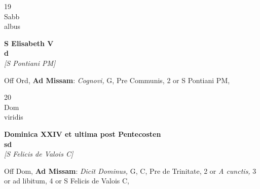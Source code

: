 \documentclass[10pt, openany]{book}
\begin{document}
        \begin{center}
            \begin{minipage}{3.5in}
                \vspace{2em}
                \begin{minipage}{0.5in}
                    {\Huge 19} \\
                    {\normalsize Sabb} \\
                    {\normalsize albus}
                \end{minipage}
                \begin{minipage}{3.0in}
                    \textbf{ \large S Elisabeth V \\
                    \textnormal{\normalsize d}} \\ \textit{[S Pontiani PM]} \\ 
                \end{minipage}
                \begin{justify}Off Ord, \textbf{Ad Missam}: \textit{Cognovi,} G, Pre Communis, 2 or S Pontiani PM,   
                \end{justify}
            \end{minipage}
        \end{center}
    
        \begin{center}
            \begin{minipage}{3.5in}
                \vspace{2em}
                \begin{minipage}{0.5in}
                    {\Huge 20} \\
                    {\normalsize Dom} \\
                    {\normalsize viridis}
                \end{minipage}
                \begin{minipage}{3.0in}
                    \textbf{ \large Dominica XXIV et ultima post Pentecosten \\
                    \textnormal{\normalsize sd}} \\ \textit{[S Felicis de Valois C]} \\ 
                \end{minipage}
                \begin{justify}Off Dom, \textbf{Ad Missam}: \textit{Dicit Dominus,} G, C, Pre de Trinitate, 2 or \textit{A cunctis,} 3 or ad libitum, 4 or S Felicis de Valois C,   
                \end{justify}
            \end{minipage}
        \end{center}
    
\end{document}

